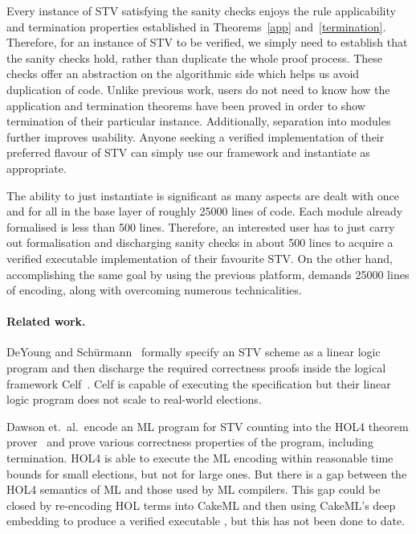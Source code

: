 \documentclass{llncs}
\begin{document}
Every instance of STV satisfying the sanity checks enjoys the
rule applicability and termination properties established in
Theorems~\ref{app} and~\ref{termination}. Therefore, for an instance
of STV to be verified, we simply need to 
establish that the sanity checks hold, 
rather than duplicate the whole proof process. These checks
offer an abstraction on the algorithmic side which helps us
avoid
duplication of code. Unlike previous work, users do
not need to know how the application  and termination theorems have been
proved in order to show termination of their particular instance. Additionally, separation into modules
further improves usability. Anyone seeking a verified implementation of
their preferred flavour of STV can simply use our framework and
instantiate as appropriate.

The ability to just instantiate is significant as many
aspects are dealt with once and for all
in the base layer of roughly 25000 lines of
code. Each module already formalised is less than 500 lines.
Therefore, an interested user has to just carry out formalisation
and discharging sanity checks in about 500 lines to acquire a
verified executable implementation of their favourite STV. On the
other hand, accomplishing the same goal by using the previous
platform, demands  25000 lines of encoding, along with overcoming
numerous technicalities.   

\paragraph{\textbf{Related work.}}
DeYoung and Sch\"urmann~\cite{DeYoung:2012:LLV}
formally specify an STV
scheme as a linear logic~\cite{DBLP:journals/apal/Girard93} program
and then discharge the required correctness 
proofs inside the logical framework
Celf~\cite{DBLP:conf/cade/Schack-NielsenS08}. Celf is capable of
executing the specification but their linear logic program does not scale to real-world
elections.

Dawson et.\ al.\ encode an ML program for STV counting into the HOL4
theorem prover~\cite{DBLP:conf/voteid/DawsonGM15} and prove various
correctness properties of the program, including termination. HOL4 is
able to execute the ML encoding within reasonable time bounds for
small elections, but not for large ones. But there is a gap between
the HOL4 semantics of ML and those used by ML compilers. This gap
could be closed by re-encoding HOL terms into CakeML and then using
CakeML's deep embedding to produce a verified executable
\cite{POPL14}, but this
has not been done to date. 
\end{document}
